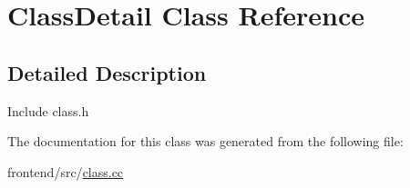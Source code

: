 \hypertarget{classClassDetail}{\section{Class\-Detail Class Reference}
\label{classClassDetail}
}


\subsection{Detailed Description}
Include class.\-h 

The documentation for this class was generated from the following file\-:\begin{DoxyCompactItemize}
\item 
frontend/src/\hyperlink{class_8cc}{class.\-cc}\end{DoxyCompactItemize}
